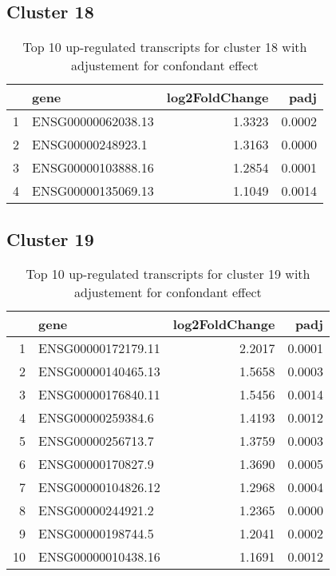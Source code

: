 \documentclass{article}
\begin{document}
\subsection{Cluster 18 }
\begin{table}[H]
\centering
\begin{tabular}{rlrr}
  \hline
 & gene & log2FoldChange & padj \\ 
  \hline
1 & ENSG00000062038.13 & 1.3323 & 0.0002 \\ 
  2 & ENSG00000248923.1 & 1.3163 & 0.0000 \\ 
  3 & ENSG00000103888.16 & 1.2854 & 0.0001 \\ 
  4 & ENSG00000135069.13 & 1.1049 & 0.0014 \\ 
   \hline
\end{tabular}
\caption{Top 10 up-regulated transcripts for cluster 18 with adjustement for confondant effect} 
\label{tab:q3_1_conf_18}
\end{table}
\subsection{Cluster 19 }
\begin{table}[H]
\centering
\begin{tabular}{rlrr}
  \hline
 & gene & log2FoldChange & padj \\ 
  \hline
1 & ENSG00000172179.11 & 2.2017 & 0.0001 \\ 
  2 & ENSG00000140465.13 & 1.5658 & 0.0003 \\ 
  3 & ENSG00000176840.11 & 1.5456 & 0.0014 \\ 
  4 & ENSG00000259384.6 & 1.4193 & 0.0012 \\ 
  5 & ENSG00000256713.7 & 1.3759 & 0.0003 \\ 
  6 & ENSG00000170827.9 & 1.3690 & 0.0005 \\ 
  7 & ENSG00000104826.12 & 1.2968 & 0.0004 \\ 
  8 & ENSG00000244921.2 & 1.2365 & 0.0000 \\ 
  9 & ENSG00000198744.5 & 1.2041 & 0.0002 \\ 
  10 & ENSG00000010438.16 & 1.1691 & 0.0012 \\ 
   \hline
\end{tabular}
\caption{Top 10 up-regulated transcripts for cluster 19 with adjustement for confondant effect} 
\label{tab:q3_1_conf_19}
\end{table}
\end{document}
